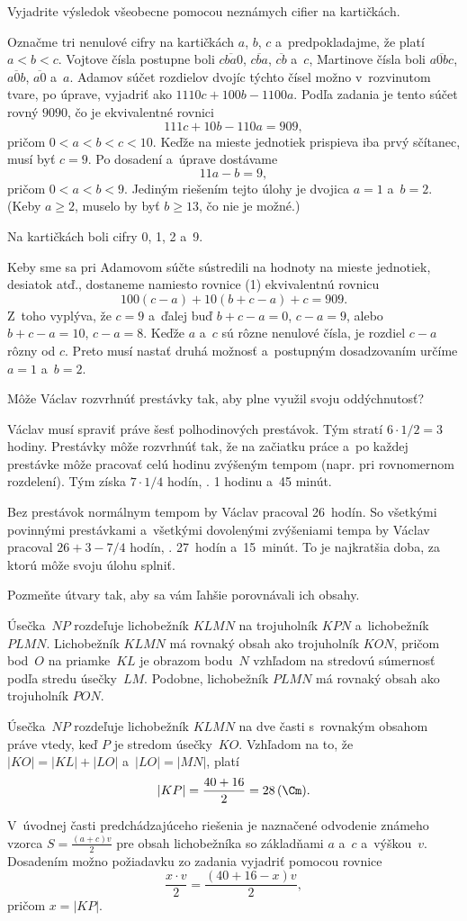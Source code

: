 {%
\napad
Vyjadrite výsledok všeobecne pomocou neznámych cifier na kartičkách.

\riesenie
Označme tri nenulové cifry na kartičkách $a$, $b$, $c$ a~predpokladajme, že platí $a<b<c$.
Vojtove čísla postupne boli $\overline{cba0}$, $\overline{cba}$, $\overline{cb}$ a~$c$,
Martinove čísla boli $\overline{a0bc}$, $\overline{a0b}$, $\overline{a0}$ a~$a$.
Adamov súčet rozdielov dvojíc týchto čísel možno v~rozvinutom tvare, po úprave, vyjadriť ako
$1110c+100b-1100a$.
Podľa zadania je tento súčet rovný $9090$, čo je ekvivalentné rovnici
$$
111c+10b-110a=909, \tag{1}
$$
pričom $0<a<b<c<10$.
Keďže na mieste jednotiek prispieva iba prvý sčítanec, musí byť $c=9$.
Po dosadení a~úprave dostávame
$$
11a-b=9,
$$
pričom $0<a<b<9$.
Jediným riešením tejto úlohy je dvojica $a=1$ a~$b=2$.
(Keby $a\ge2$, muselo by byť $b\ge13$, čo nie je možné.)

Na kartičkách boli cifry 0, 1, 2 a~9.

\poznamka
Keby sme sa pri Adamovom súčte sústredili na hodnoty na mieste jednotiek, desiatok atď., dostaneme namiesto rovnice (1) ekvivalentnú rovnicu
$$
100(c-a)+10(b+c-a)+c=909.
$$
Z~toho vyplýva, že $c=9$ a~ďalej buď $b+c-a=0$, $c-a=9$, alebo $b+c-a=10$, $c-a=8$.
Keďže $a$ a~$c$ sú rôzne nenulové čísla, je rozdiel $c-a$ rôzny od $c$.
Preto musí nastať druhá možnosť a~postupným dosadzovaním určíme $a=1$ a~$b=2$.
}

{%
\napad
Môže Václav rozvrhnúť prestávky tak, aby plne využil svoju oddýchnutosť?

\riesenie
Václav musí spraviť práve šesť polhodinových prestávok.
Tým stratí $6\cdot 1/2=3$ hodiny.
Prestávky môže rozvrhnúť tak, že na začiatku práce a~po každej prestávke môže pracovať celú hodinu zvýšeným tempom (napr. pri rovnomernom rozdelení).
Tým získa $7\cdot 1/4$ hodín, \tj. 1 hodinu a~45 minút.

Bez prestávok normálnym tempom by Václav pracoval 26~hodín.
So všetkými povinnými prestávkami a~všetkými dovolenými zvýšeniami tempa by Václav pracoval $26+3-7/4$ hodín, \tj. 27~hodín a~15~minút.
To je najkratšia doba, za ktorú môže svoju úlohu splniť.
}

{%
\napad
Pozmeňte útvary tak, aby sa vám ľahšie porovnávali ich obsahy.

\riesenie
Úsečka~$NP$ rozdeľuje lichobežník $KLMN$ na trojuholník $KPN$ a~lichobežník $PLMN$.
Lichobežník $KLMN$ má rovnaký obsah ako trojuholník $KON$, pričom bod~$O$ na priamke~$KL$ je obrazom bodu~$N$ vzhľadom na stredovú súmernosť podľa stredu úsečky~$LM$.
Podobne, lichobežník $PLMN$ má rovnaký obsah ako trojuholník $PON$.
%


Úsečka~$NP$ rozdeľuje lichobežník $KLMN$ na dve časti s~rovnakým obsahom práve vtedy, keď $P$ je stredom úsečky~$KO$.
Vzhľadom na to, že $|KO|=|KL|+|LO|$ a~$|LO|=|MN|$, platí
$$
|KP| =\frac{40+16}2=28\,(\Cm).
$$

\poznamka
V~úvodnej časti predchádzajúceho riešenia je naznačené odvodenie známeho vzorca $S=\frac{(a+c)v}2$ pre obsah lichobežníka so základňami $a$ a~$c$ a~výškou~$v$.
Dosadením možno požiadavku zo zadania vyjadriť pomocou rovnice
$$
\frac{x\cdot v}2=\frac{(40+16-x)v}2,
$$
pričom $x=|KP|$.


}

